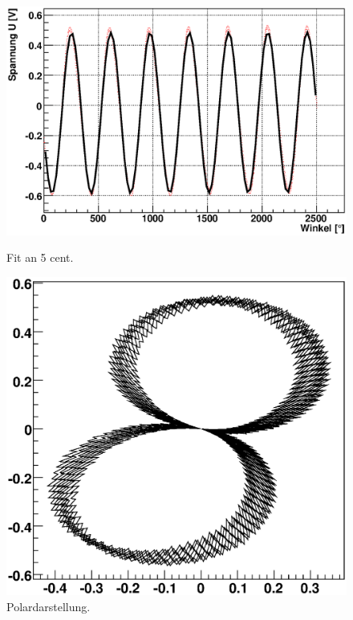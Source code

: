 \documentclass[12pt]{article}
\begin{document}
\begin{figure}[H]  
\begin{minipage}{0.5\linewidth}
\centering
\includegraphics[width=0.9\linewidth]{pictures/5cent.eps}
\caption{Fit an 5 cent.}
\end{minipage}
\begin{minipage}{0.5\linewidth}
\centering 
\includegraphics[width=0.9\linewidth]{pictures/5centvd.eps}
\caption{Polardarstellung.}
\end{minipage}
\end{figure}
\end{document}
